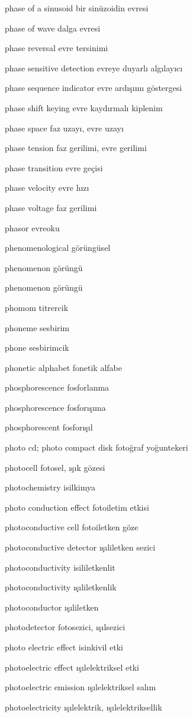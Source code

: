 \documentclass[12pt,fleqn]{article}\usepackage{../../common}
\begin{document}
phase of a sinusoid bir sinüzoidin evresi

phase of wave dalga evresi

phase reversal evre tersinimi

phase sensitive detection evreye duyarlı algılayıcı

phase sequence indicator evre ardışımı göstergesi

phase shift keying evre kaydırmalı kiplenim

phase space faz uzayı, evre uzayı

phase tension faz gerilimi, evre gerilimi

phase transition evre geçisi

phase velocity evre hızı

phase voltage faz gerilimi

phasor evreoku

phenomenological görüngüsel

phenomenon görüngü

phenomenon görüngü

phomom titrercik

phoneme sesbirim

phone sesbirimcik

phonetic alphabet fonetik alfabe

phosphorescence fosforlanma

phosphorescence fosforışıma

phosphorescent fosforışıl

photo cd; photo compact disk fotoğraf yoğuntekeri

photocell fotosel, ışık gözesi

photochemistry isilkimya

photo conduction effect fotoiletim etkisi

photoconductive cell fotoiletken göze

photoconductive detector ışıliletken sezici

photoconductivity isililetkenlit

photoconductivity ışıliletkenlik

photoconductor ışıliletken

photodetector fotosezici, ışılsezici

photo electric effect isinkivil etki

photoelectric effect ışılelektriksel etki

photoelectric emission ışılelektriksel salım

photoelectricity ışılelektrik, ışılelektriksellik
\end{document}
